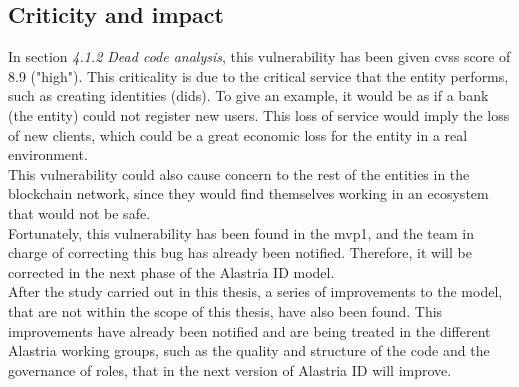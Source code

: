 \subsection{Criticity and impact}
In section \textit{4.1.2 Dead code analysis}, this vulnerability has been given \acrshort{cvss} score of 8.9 ("high"). This criticality is due to the critical service that the entity performs, such as creating identities (\acrshort{did}s). To give an example, it would be as if a bank (the entity) could not register new users. This loss of service would imply the loss of new clients, which could be a great economic loss for the entity in a real environment.\\

This vulnerability could also cause concern to the rest of the entities in the blockchain network, since they would find themselves working in an ecosystem that would not be safe.\\

Fortunately, this vulnerability has been found in the \acrshort{mvp}1, and the team in charge of correcting this bug has already been notified. Therefore, it will be corrected in the next phase of the Alastria ID model.\\

After the study carried out in this thesis, a series of improvements to the model, that are not within the scope of this thesis, have also been found. This improvements have already been notified and are being treated in the different Alastria working groups, such as the quality and structure of the code and the governance of roles, that in the next version of Alastria ID will improve.


